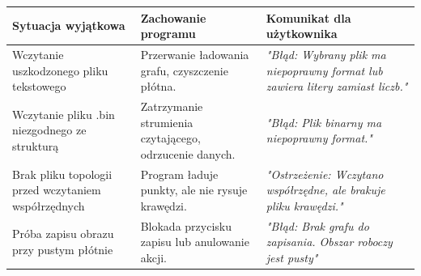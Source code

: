 \documentclass[12pt, a4paper]{article}
\begin{document}
\begin{table}[H]
\centering
\renewcommand{\arraystretch}{1.5}
\begin{tabular}{|p{4.5cm}|p{5cm}|p{5cm}|}
\hline
\textbf{Sytuacja wyjątkowa} & \textbf{Zachowanie programu} & \textbf{Komunikat dla użytkownika} \\
\hline
Wczytanie uszkodzonego pliku tekstowego & Przerwanie ładowania grafu, czyszczenie płótna. & \textit{"Błąd: Wybrany plik ma niepoprawny format lub zawiera litery zamiast liczb."} \\
\hline
Wczytanie pliku .bin niezgodnego ze strukturą & Zatrzymanie strumienia czytającego, odrzucenie danych. & \textit{"Błąd: Plik binarny ma niepoprawny format."} \\
\hline
Brak pliku topologii przed wczytaniem współrzędnych & Program ładuje punkty, ale nie rysuje krawędzi. & \textit{"Ostrzeżenie: Wczytano współrzędne, ale brakuje pliku krawędzi."} \\
\hline
Próba zapisu obrazu przy pustym płótnie & Blokada przycisku zapisu lub anulowanie akcji. & \textit{"Błąd: Brak grafu do zapisania. Obszar roboczy jest pusty"} \\
\hline
\end{tabular}
\end{table}
\end{document}

